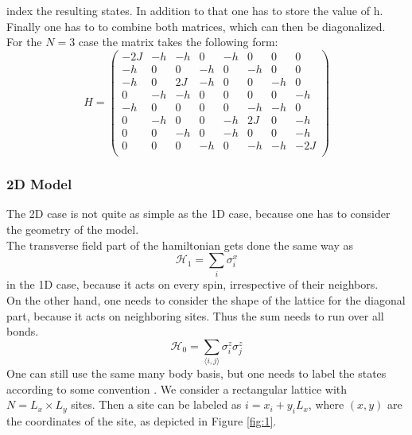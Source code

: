 \documentclass{article}
\begin{document}
index the resulting states. In addition to that one has to store the value of h.\\
Finally one has to to combine both matrices, which can then be
diagonalized.\\
For the $N = 3$ case the matrix takes the following form:
\begin{equation*}
\label{eq:23}
H = 
\begin{pmatrix}
-2J & -h & -h &  0& -h & 0 &0 &0 \\
-h &0 &0 & -h &  0& -h & 0& 0\\
-h & 0& 2J & -h & 0& 0& -h &0 \\
 0& -h & -h&0 & 0& 0& 0& -h\\
-h &0 &0 &0 &0 & -h & -h &0 \\
 0& -h &0 &0 & -h & 2J &0 & -h\\
 0& 0& -h & 0& -h &0 &0 & -h\\
 0& 0& 0& -h & 0& -h & -h & -2J\\
\end{pmatrix}
\end{equation*}

\subsubsection{2D Model}
The 2D case is not quite as simple as the 1D case, because one has to
consider the geometry of the model.\\
The transverse field part of the hamiltonian gets done the same way as
\begin{equation}
\label{eq:25}
\mathcal{H}_1 = \sum\limits_i \sigma_i^x
\end{equation}
in the 1D case, because it acts on every spin, irrespective of
their neighbors.\\
On the other hand, one needs to consider the shape of the lattice for
the diagonal part, because it acts on neighboring sites. Thus the sum
needs to run over all bonds.
\begin{equation}
\label{eq:26}
\mathcal{H}_0 = \sum\limits_{\langle i,j \rangle} \sigma_i^z \sigma_j^z
\end{equation}
One can still use the same many body basis, but one needs to label the
states according to some convention \cite{Sandvik}. We consider a rectangular lattice
with $N = L_x \times L_y$ sites. Then a site can be labeled as $i =
x_i + y_iL_x$, where $(x,y)$ are the coordinates of the site, as
depicted in Figure \eqref{fig:1}.\\
\end{document}
